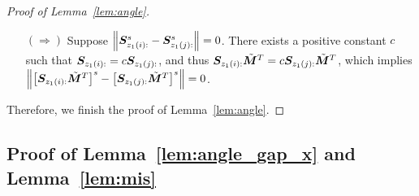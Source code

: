 \documentclass[journal]{IEEEtran}
\theoremstyle{definition}
\theoremstyle{definition}
\begin{document}
\begin{proof}[Proof of Lemma~\ref{lem:angle}]
\begin{enumerate}[wide]
\item[$(\Rightarrow)$] Suppose $ \left\lVert \bm S_{z_1(i):}^s - \bm S_{z_1(j):}^s \right\rVert = 0 $. There exists a positive constant $c$ such that $\bm S_{z_1(i):} = c \bm S_{z_1(j):}$, and thus $\bm S_{z_1(i):} \tilde {\bm M}^T = c \bm S_{z_1(j):} \tilde {\bm M}^T$, which implies $\left\lVert\left[\bm S_{z_1(i):} \tilde {\bm M}^T\right]^s- \left[\bm S_{z_1(j):} \tilde {\bm M}^T\right]^s\right\rVert=0$.
\end{enumerate}
Therefore, we finish the proof of Lemma~\ref{lem:angle}.
\end{proof}

\subsection{Proof of Lemma~\ref{lem:angle_gap_x} and Lemma~\ref{lem:mis}}
\end{document}
